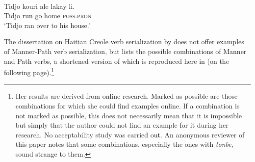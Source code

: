\documentclass[output=paper,colorlinks,citecolor=brown]{langscibook}
\begin{document}
\ea\label{ex:3:19} \citep[244]{Valdman_2015}\\
\gll  Tidjo kouri ale lakay li. \\
      Tidjo run go home \textsc{poss.pron} \\
\glt ‘Tidjo ran over to his house.’
\z

The dissertation on Haitian Creole verb serialization by \citet{BucheliBerger_2009} does not offer examples of Manner-Path verb serialization, but lists the possible combinations of Manner and Path verbs, a shortened version of which is reproduced here in  (on the following page).\footnote{Her results are derived from online research. Marked as possible are those combinations for which she could find examples online. If a combination is not marked as possible, this does not necessarily mean that it is impossible but simply that the author could not find an example for it during her research. No acceptability study was carried out. An anonymous reviewer of this paper notes that some combinations, especially the ones with \emph{tonbe}, sound strange to them.}

\begin{table}
\caption{Manner of Motion V1 + Path of Motion V2 in Haitian Creole after \citet[202]{BucheliBerger_2009}}
\label{tab:tab1_03}
\end{table}
\end{document}
